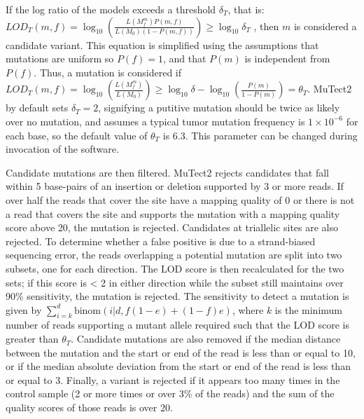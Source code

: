 If the log ratio of the models exceeds a threshold $\delta{}_T$, that is: $LOD_T(m,f)=\log_{10} \left(\frac{L(M_f^m)P(m,f)}{L(M_0)(1-P(m,f))}\right) \geq \log_{10} \delta{}_T$ , then $m$ is considered a candidate variant. This equation is simplified using the assumptions that mutations are uniform so $P(f)=1$, and that $P(m)$ is independent from $P(f)$. Thus, a mutation is considered if $LOD_T(m,f)=\log_{10} \left(\frac{L(M_f^m)}{L(M_0)}\right) \geq \log_{10} \delta{} - \log_{10}  \left(\frac{P(m)}{1-P(m)}\right) = \theta{}_T$. MuTect2 by default sets $\delta{}_T = 2$, signifying a putitive mutation should be twice as likely over no mutation, and assumes a typical tumor mutation frequency is $1 \times 10^{-6}$ for each base, so the default value of $\theta{}_T$ is 6.3. This parameter can be changed during invocation of the software.

Candidate mutations are then filtered. MuTect2 rejects candidates that fall within 5 base-pairs of an insertion or deletion supported by 3 or more reads. If over half the reads that cover the site have a mapping quality of 0 or there is not a read that covers the site and supports the mutation with a mapping quality score above 20, the mutation is rejected. Candidates at triallelic sites are also rejected. To determine whether a false positive is due to a strand-biased sequencing error, the reads overlapping a potential mutation are split into two subsets, one for each direction. The LOD score is then recalculated for the two sets; if this score is < 2 in either direction while the subset still maintains over 90\% sensitivity, the mutation is rejected. The sensitivity to detect a mutation is given by $\sum_{i=k}^d \text{binom}(i|d,f(1-e)+(1-f)e)$, where $k$ is the minimum number of reads supporting a mutant allele required such that the LOD score is greater than $\theta{}_T$. Candidate mutations are also removed if the median distance between the mutation and the start or end of the read is less than or equal to 10, or if the median absolute deviation from the start or end of the read is less than or equal to 3. Finally, a variant is rejected if it appears too many times in the control sample (2 or more times or over 3\% of the reads) and the sum of the quality scores of those reads is over 20.

